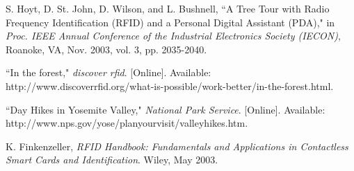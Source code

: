 \documentclass[conference]{IEEEtran}
\begin{document}
\begin{thebibliography}{1}
S. Hoyt, D. St. John, D. Wilson, and L. Bushnell, ``A Tree Tour with Radio Frequency Identification (RFID) and a Personal Digital Assistant (PDA)," in \emph{Proc. IEEE Annual Conference of the Industrial Electronics Society (IECON)}, Roanoke, VA, Nov. 2003, vol. 3, pp. 2035-2040.

``In the forest," \emph{discover rfid}. [Online]. Available: http://www.discoverrfid.org/what-is-possible/work-better/in-the-forest.html.

``Day Hikes in Yosemite Valley," \emph{National Park Service}. [Online]. Available: http://www.nps.gov/yose/planyourvisit/valleyhikes.htm.

K. Finkenzeller, \emph{RFID Handbook: Fundamentals and Applications in Contactless Smart Cards and Identification}. Wiley, May 2003.

\end{thebibliography}
\end{document}
